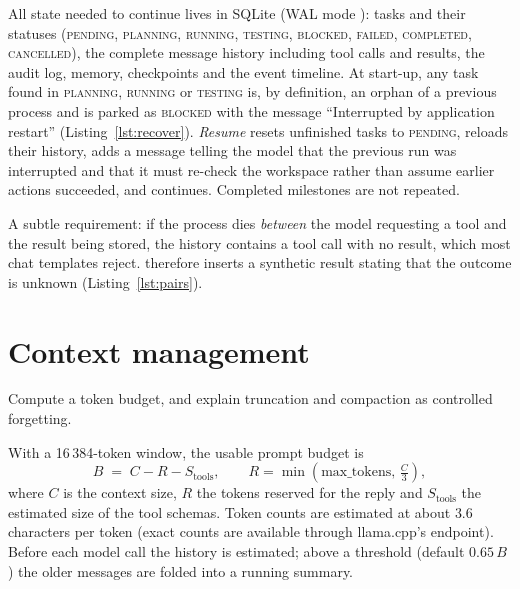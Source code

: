 \documentclass[11pt,a4paper]{article}
\newcommand{\code}[1]{\texttt{\detokenize{#1}}}
\begin{document}
All state needed to continue lives in SQLite (WAL mode \citep{sqlite}): tasks and their statuses (\textsc{pending, planning, running, testing, blocked, failed, completed, cancelled}), the complete message history including tool calls and results,
the audit log, memory, checkpoints and the event timeline. At start-up, any task found in \textsc{planning}, \textsc{running} or \textsc{testing} is, by definition, an orphan of a previous process and is parked as \textsc{blocked} with the message
``Interrupted by application restart'' (Listing~\ref{lst:recover}). \emph{Resume} resets unfinished tasks to \textsc{pending}, reloads their history, adds a message telling the model that the previous run was interrupted and that
it must re-check the workspace rather than assume earlier actions succeeded, and continues. Completed milestones are not repeated.


A subtle requirement: if the process dies \emph{between} the model requesting a tool and the result being stored, the history contains a tool call with no result, which most chat templates reject.
\code{repair_tool_pairs} therefore inserts a synthetic result stating that the outcome is unknown (Listing~\ref{lst:pairs}).




\section{Context management}\label{sec:context}
\begin{objectives}
Compute a token budget, and explain truncation and compaction as controlled forgetting.
\end{objectives}

With a 16\,384-token window, the usable prompt budget is
\[
B \;=\; C - R - S_{\text{tools}},\qquad R=\min\!\left(\text{max\_tokens},\,\tfrac{C}{3}\right),
\]
where $C$ is the context size, $R$ the tokens reserved for the reply and $S_{\text{tools}}$ the estimated size of the tool schemas. Token counts are estimated at about $3.6$ characters per token (exact counts are available through llama.cpp's \code{/tokenize} endpoint).
Before each model call the history is estimated; above a threshold (default $0.65\,B$) the older messages are folded into a running summary.
\end{document}
